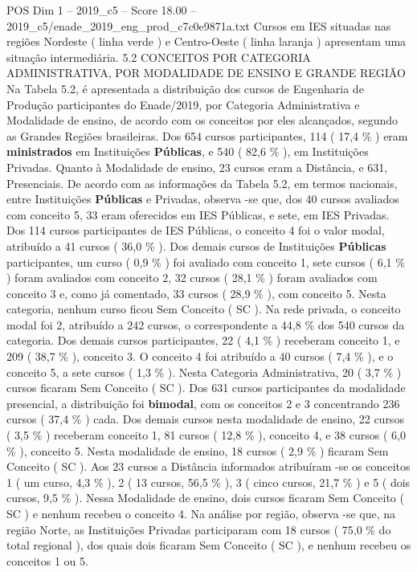 \begin{textsample}{POS Dim 1 – 2019\_c5 – Score 18.00 – 2019\_c5/enade\_2019\_eng\_prod\_c7c0e9871a.txt}
Cursos em IES situadas nas regiões Nordeste ( linha verde ) e Centro-Oeste ( linha laranja ) apresentam uma situação intermediária. 5.2 CONCEITOS POR CATEGORIA ADMINISTRATIVA, POR MODALIDADE DE ENSINO E GRANDE REGIÃO Na Tabela 5.2, é apresentada a distribuição dos cursos de Engenharia de Produção participantes do Enade/2019, por Categoria Administrativa e Modalidade de ensino, de acordo com os conceitos por eles alcançados, segundo as Grandes Regiões brasileiras.
Dos 654 cursos participantes, 114 ( 17,4 \% ) eram \textbf{ministrados} em Instituições \textbf{Públicas}, e 540 ( 82,6 \% ), em Instituições Privadas.
Quanto à Modalidade de ensino, 23 cursos eram a Distância, e 631, Presenciais.
De acordo com as informações da Tabela 5.2, em termos nacionais, entre Instituições \textbf{Públicas} e Privadas, observa -se que, dos 40 cursos avaliados com conceito 5, 33 eram oferecidos em IES Públicas, e sete, em IES Privadas.
Dos 114 cursos participantes de IES Públicas, o conceito 4 foi o valor modal, atribuído a 41 cursos ( 36,0 \% ).
Dos demais cursos de Instituições \textbf{Públicas} participantes, um curso ( 0,9 \% ) foi avaliado com conceito 1, sete cursos ( 6,1 \% ) foram avaliados com conceito 2, 32 cursos ( 28,1 \% ) foram avaliados com conceito 3 e, como já comentado, 33 cursos ( 28,9 \% ), com conceito 5.
Nesta categoria, nenhum curso ficou Sem Conceito ( SC ).
Na rede privada, o conceito modal foi 2, atribuído a 242 cursos, o correspondente a 44,8 \% dos 540 cursos da categoria.
Dos demais cursos participantes, 22 ( 4,1 \% ) receberam conceito 1, e 209 ( 38,7 \% ), conceito 3.
O conceito 4 foi atribuído a 40 cursos ( 7,4 \% ), e o conceito 5, a sete cursos ( 1,3 \% ).
Nesta Categoria Administrativa, 20 ( 3,7 \% ) cursos ficaram Sem Conceito ( SC ).
Dos 631 cursos participantes da modalidade presencial, a distribuição foi \textbf{bimodal}, com os conceitos 2 e 3 concentrando 236 cursos ( 37,4 \% ) cada.
Dos demais cursos nesta modalidade de ensino, 22 cursos ( 3,5 \% ) receberam conceito 1, 81 cursos ( 12,8 \% ), conceito 4, e 38 cursos ( 6,0 \% ), conceito 5.
Nesta modalidade de ensino, 18 cursos ( 2,9 \% ) ficaram Sem Conceito ( SC ).
Aos 23 cursos a Distância informados atribuíram -se os conceitos 1 ( um curso, 4,3 \% ), 2 ( 13 cursos, 56,5 \% ), 3 ( cinco cursos, 21,7 \% ) e 5 ( dois cursos, 9,5 \% ).
Nessa Modalidade de ensino, dois cursos ficaram Sem Conceito ( SC ) e nenhum recebeu o conceito 4.
Na análise por região, observa -se que, na região Norte, as Instituições Privadas participaram com 18 cursos ( 75,0 \% do total regional ), dos quais dois ficaram Sem Conceito ( SC ), e nenhum recebeu os conceitos 1 ou 5.

\end{textsample}
